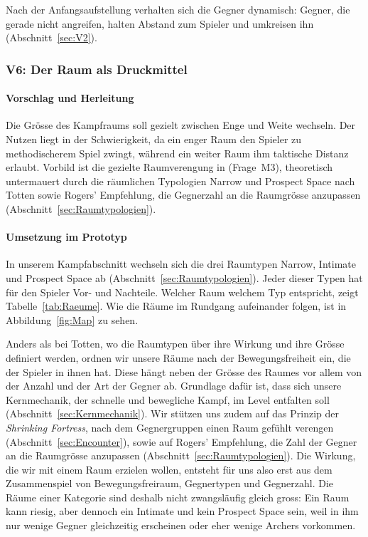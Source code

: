 \documentclass[../Main.tex]{subfiles}
\begin{document}
Nach der Anfangsaufstellung verhalten sich die Gegner dynamisch: Gegner, die gerade nicht angreifen, halten Abstand zum Spieler und umkreisen ihn (Abschnitt~\ref{sec:V2}).

\subsubsection{V6: Der Raum als Druckmittel} \label{sec:V6}

\paragraph{Vorschlag und Herleitung}
Die Grösse des Kampfraums soll gezielt zwischen Enge und Weite wechseln. Der Nutzen liegt in der Schwierigkeit, da ein enger Raum den Spieler zu methodischerem Spiel zwingt, während ein weiter Raum ihm taktische Distanz erlaubt. Vorbild ist die gezielte Raumverengung in  (Frage~M3), theoretisch untermauert durch die räumlichen Typologien Narrow und Prospect Space nach Totten sowie Rogers' Empfehlung, die Gegnerzahl an die Raumgrösse anzupassen (Abschnitt~\ref{sec:Raumtypologien}).

\paragraph{Umsetzung im Prototyp}
In unserem Kampfabschnitt wechseln sich die drei Raumtypen Narrow, Intimate und Prospect Space ab (Abschnitt~\ref{sec:Raumtypologien}). Jeder dieser Typen hat für den Spieler Vor- und Nachteile. Welcher Raum welchem Typ entspricht, zeigt Tabelle~\ref{tab:Raeume}. Wie die Räume im Rundgang aufeinander folgen, ist in Abbildung~\ref{fig:Map} zu sehen.

Anders als bei Totten, wo die Raumtypen über ihre Wirkung und ihre Grösse definiert werden, ordnen wir unsere Räume nach der Bewegungsfreiheit ein, die der Spieler in ihnen hat. Diese hängt neben der Grösse des Raumes vor allem von der Anzahl und der Art der Gegner ab. Grundlage dafür ist, dass sich unsere Kernmechanik, der schnelle und bewegliche Kampf, im Level entfalten soll (Abschnitt~\ref{sec:Kernmechanik}). Wir stützen uns zudem auf das Prinzip der \textit{Shrinking Fortress}, nach dem Gegnergruppen einen Raum gefühlt verengen (Abschnitt~\ref{sec:Encounter}), sowie auf Rogers' Empfehlung, die Zahl der Gegner an die Raumgrösse anzupassen (Abschnitt~\ref{sec:Raumtypologien}). Die Wirkung, die wir mit einem Raum erzielen wollen, entsteht für uns also erst aus dem Zusammenspiel von Bewegungsfreiraum, Gegnertypen und Gegnerzahl. Die Räume einer Kategorie sind deshalb nicht zwangsläufig gleich gross: Ein Raum kann riesig, aber dennoch ein Intimate und kein Prospect Space sein, weil in ihm nur wenige Gegner gleichzeitig erscheinen oder eher wenige Archers vorkommen.
\end{document}
